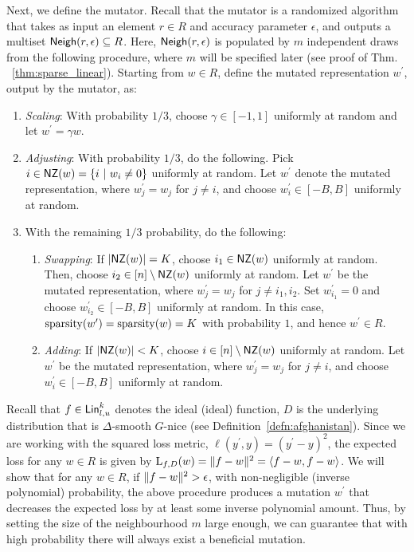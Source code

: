 Next, we define the mutator. Recall that the mutator is a randomized algorithm
that takes as input an element $r \in R$ and accuracy parameter $\epsilon$, and
outputs a multiset $\mathsf{Neigh}(r, \epsilon) \subseteq R$. Here, $\mathsf{Neigh}(r,
\epsilon)$ is populated by $m$ independent draws from the following procedure,
where $m$ will be specified later (see proof of Thm. ~\ref{thm:sparse_linear}).
Starting from $w \in R$, define the mutated representation $w^\prime$, output by
the mutator, as:
\begin{enumerate}
%
\item {\em Scaling}: With probability $1/3$, choose $\gamma \in [-1, 1]$ uniformly at
random and let $w^\prime = \gamma w$. 
%
\item {\em Adjusting}: With probability $1/3$, do the following.  Pick $i \in
\mathsf{NZ}(w) = \{ i~|~ w_i \neq 0 \}$ uniformly at random. Let $w^\prime$ denote the
mutated representation, where $w^\prime_j = w_j$ for $j \neq i$, and choose
$w^\prime_i \in [-B, B]$ uniformly at random.
%
\item With the remaining $1/3$ probability, do the following:
\begin{enumerate}
\item {\em Swapping}: If $|\mathsf{NZ}(w)| = K$, choose $i_1 \in \mathsf{NZ}(w)$ uniformly at random.
Then, choose $i_2 \in [n] \setminus \mathsf{NZ}(w)$ uniformly at random. Let $w^\prime$
be the mutated representation, where $w_j^\prime = w_j$ for $j \neq i_1, i_2$.
Set $w_{i_1}^\prime = 0$ and choose $w_{i_2}^\prime \in [-B, B]$ uniformly at
random. In this case, $\mathrm{sparsity}(w^\prime) = \mathrm{sparsity}(w) = K$
with probability $1$, and hence $w^\prime \in R$.
\item {\em Adding}: If $|\mathsf{NZ}(w)| < K$, choose $i \in [n] \setminus \mathsf{NZ}(w)$ uniformly
at random. Let $w^\prime$ be the mutated representation, where $w_j^\prime =
w_j$ for $j \neq i$, and choose $w^\prime_i \in [-B, B]$ uniformly at random.
\end{enumerate}
\end{enumerate}

Recall that $f \in \mathsf{Lin}^k_{l, u}$ denotes the ideal (ideal) function, $D$ is the
underlying distribution that is $\Delta$-smooth $G$-nice (see
Definition~\ref{defn:afghanistan}). Since we are working with the squared loss
metric, $\ell(y^\prime, y) = (y^\prime - y)^2$, the expected loss for any $w \in
R$ is given by $\mathrm{L}_{f, D}(w) = \Vert f - w \Vert^2 = \langle f - w, f - w \rangle$.  We
will show that for any $w \in R$, if $\Vert f - w \Vert^2 > \epsilon$, with
non-negligible (inverse polynomial) probability, the above procedure produces a
mutation $w^\prime$ that decreases the expected loss by at least some inverse
polynomial amount. Thus, by setting the size of the neighbourhood $m$ large
enough, we can guarantee that with high probability there will always exist a
beneficial mutation.
%

